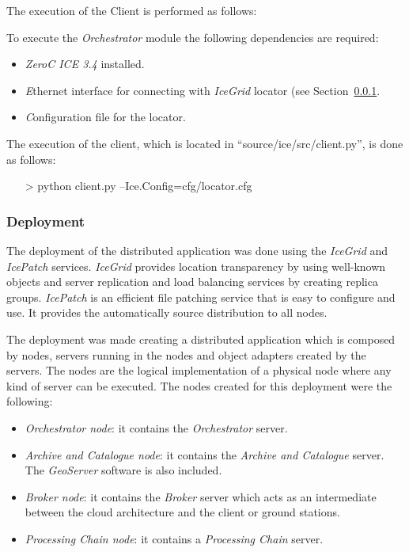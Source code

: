 The execution of the Client is performed as follows:

To execute the \emph{Orchestrator} module the following dependencies
are required:
\begin{itemize}
\item \emph{ZeroC ICE 3.4} installed.
\item \emph Ethernet interface for connecting with \emph{IceGrid} locator (see
  Section~\ref{subsub:deployment}.
\item \emph Configuration file for the locator.
\end{itemize}

The execution of the client, which is located in ``source/ice/src/client.py'',
is done as follows:
\begin{itemize}
\item[>] python client.py --Ice.Config=cfg/locator.cfg
\end{itemize}


\subsubsection{Deployment}
\label{subsub:deployment}

The deployment of the distributed application was done using the \emph{IceGrid}
and \emph{IcePatch} services. 
\emph{IceGrid} provides location transparency by using well-known objects and server replication and load
balancing services by creating replica groups. \emph{IcePatch} is an
efficient file patching service that is easy to configure and use. It provides the
automatically source distribution to all nodes.

The deployment was made creating a distributed application which is composed by
nodes, servers running in the nodes and object adapters created by the servers. 
The nodes are the logical implementation of a physical node where any kind of
server can be executed. The nodes created for this deployment were the
following:

\begin{itemize}
\item \emph{Orchestrator node}: it contains the \emph{Orchestrator} server.
\item \emph{Archive and Catalogue node}: it contains the \emph{Archive and Catalogue}
  server. The \emph{GeoServer} software is also included.
\item \emph{Broker node}: it contains the \emph{Broker} server which acts as an
  intermediate between the cloud architecture and the client or ground stations.
\item \emph{Processing Chain node}: it contains a \emph{Processing Chain} server. 
\end{itemize}


